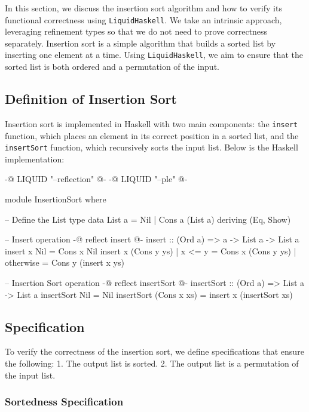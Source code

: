 \documentclass[]{rptuseminar}
\begin{document}
In this section, we discuss the insertion sort algorithm and how to verify its functional correctness using \texttt{LiquidHaskell}.  
We take an intrinsic approach, leveraging refinement types so that we do not need to prove correctness separately.  
Insertion sort is a simple algorithm that builds a sorted list by inserting one element at a time.  
Using \texttt{LiquidHaskell}, we aim to ensure that the sorted list is both ordered and a permutation of the input.  

\subsection{Definition of Insertion Sort}

Insertion sort is implemented in Haskell with two main components: 
the \texttt{insert} function, which places an element in its correct position in a sorted list, 
and the \texttt{insertSort} function, which recursively sorts the input list. Below is the Haskell implementation:

\begin{haskell}
{-@ LIQUID "--reflection" @-}
{-@ LIQUID "--ple" @-}

module InsertionSort where

-- Define the List type
data List a = Nil | Cons a (List a) deriving (Eq, Show)

-- Insert operation
{-@ reflect insert @-}
insert :: (Ord a) => a -> List a -> List a
insert x Nil = Cons x Nil
insert x (Cons y ys)
  | x <= y    = Cons x (Cons y ys)
  | otherwise = Cons y (insert x ys)

-- Insertion Sort operation
{-@ reflect insertSort @-}
insertSort :: (Ord a) => List a -> List a
insertSort Nil = Nil
insertSort (Cons x xs) = insert x (insertSort xs)
\end{haskell}

\subsection{Specification}

To verify the correctness of the insertion sort, we define specifications that ensure the following:
1. The output list is sorted.
2. The output list is a permutation of the input list.

\subsubsection{Sortedness Specification}
\end{document}

